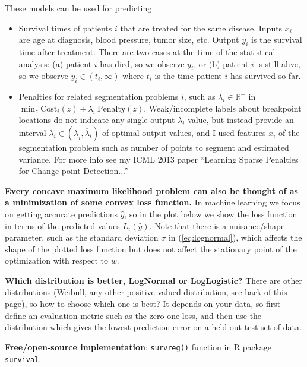 \documentclass[11pt,twocolumn,a4paper]{article}
\newcommand{\RR}{\mathbb R}
\begin{document}



These models can be used for predicting
\begin{itemize}
\item Survival times of patients $i$ that are treated for the same
  disease. Inputs $x_i$ are age at diagnosis, blood pressure, tumor
  size, etc. Output $y_i$ is the survival time after treatment. There
  are two cases at the time of the statistical analysis: (a) patient
  $i$ has died, so we observe $y_i$, or (b) patient $i$ is still
  alive, so we observe $y_i\in(t_i,\infty)$ where $t_i$ is the time
  patient $i$ has survived so far.
\item Penalties for related segmentation problems $i$, such as
  $\lambda_i\in\RR^+$ in $\min_z \text{Cost}_i(z) + \lambda_i\
  \text{Penalty}(z)$. Weak/incomplete labels about breakpoint
  locations do not indicate any single output $\lambda_i$ value, but
  instead provide an interval
  $\lambda_i\in(\underline\lambda_i,\overline \lambda_i)$ of optimal output
  values, and I used features $x_i$ of the segmentation problem such
  as number of points to segment and estimated variance. For more info
  see my ICML 2013 paper ``Learning Sparse Penalties for Change-point
  Detection...''
\end{itemize}

\textbf{Every concave maximum likelihood problem can also be thought
  of as a minimization of some convex loss function.} In machine
learning we focus on getting accurate predictions $\hat y$, so in the
plot below we show the loss function in terms of the predicted values
$L_i(\hat y)$. Note that there is a nuisance/shape parameter, such as
the standard deviation $\sigma$ in (\ref{eq:lognormal}), which affects
the shape of the plotted loss function but does not affect the
stationary point of the optimization with respect to $w$.

\textbf{Which distribution is better, LogNormal or LogLogistic?} There
are other distributions (Weibull, any other positive-valued
distribution, see back of this page), so how to choose which one is
best? It depends on your data, so first define an evaluation metric
such as the zero-one loss, and then use the distribution which gives
the lowest prediction error on a held-out test set of data.

\textbf{Free/open-source implementation}: \texttt{survreg()} function
in R package \texttt{survival}.

\newpage
\end{document}
